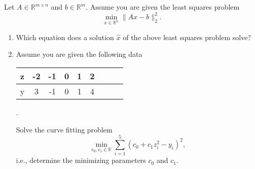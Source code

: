 Let $A \in \mathbb{R}^{m\times n}$ and $b \in \mathbb{R}^m$.
Assume you are given the least squares problem 
$$
\min\limits_{x \in \mathbb{R}^n } \| Ax - b \|_2^2.
$$
\begin{enumerate}
	\item Which equation does a solution $\hat{x}$ of the above least squares problem solve?
	\item Assume you are given the following data
	\begin{center}
		\begin{tabular}{|l|c|c|c|c|c|c||c|c|}\hline
			z&-2&-1&0&1&2\\ 
			\hline
			y&3&-1&0&1&4\\
			\hline
		\end{tabular}.
	\end{center}
	Solve the curve fitting problem
	$$
	\min\limits_{c_0, c_1 \in \mathbb{R}} \sum_{i=1}^5 (c_0 + c_1z_i^2 - y_i)^2,
	$$
	i.e., determine the minimizing parameters $c_0$ and $c_1$.
\end{enumerate}
